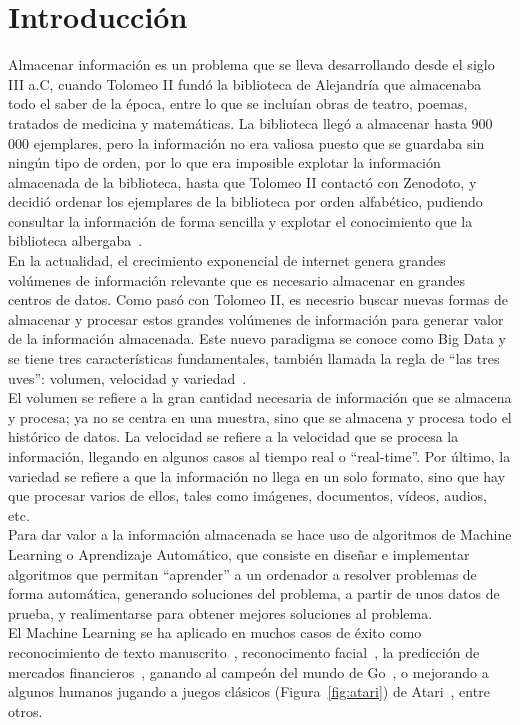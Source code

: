 \chapter{Introducción}

Almacenar información es un problema que se lleva desarrollando desde el siglo III a.C, cuando Tolomeo II fundó la biblioteca de Alejandría que almacenaba todo el saber de la época, entre lo que se incluían obras de teatro, poemas, tratados de medicina y matemáticas. La biblioteca llegó a almacenar hasta 900\,000 ejemplares, pero la información no era valiosa puesto que se guardaba sin ningún tipo de orden, por lo que era imposible explotar la información almacenada de la biblioteca, hasta que Tolomeo II contactó con Zenodoto, y decidió ordenar los ejemplares de la biblioteca por orden alfabético, pudiendo consultar la información de forma sencilla y explotar el conocimiento que la biblioteca albergaba~\cite{bigdataintroduccion}.\\

En la actualidad, el crecimiento exponencial de internet genera grandes volúmenes de información relevante que es necesario almacenar en grandes centros de datos. Como pasó con Tolomeo II, es necesrio buscar nuevas formas de almacenar y procesar estos grandes volúmenes de información para generar valor de la información almacenada. Este nuevo paradigma se conoce como Big Data y se tiene tres características fundamentales, también llamada la regla de ``las tres uves'': volumen, velocidad y variedad~\cite{bigdataoreilly}.\\
El volumen se refiere a la gran cantidad necesaria de información que se almacena y procesa; ya no se centra en una muestra, sino que se almacena y procesa todo el histórico de datos. La velocidad se refiere a la velocidad que se procesa la información, llegando en algunos casos al tiempo real o ``real-time''. Por último, la variedad se refiere a que la información no llega en un solo formato, sino que hay que procesar varios de ellos, tales como imágenes, documentos, vídeos, audios, etc.\\

Para dar valor a la información almacenada se hace uso de algoritmos de Machine Learning o Aprendizaje Automático, que consiste en diseñar e implementar algoritmos que permitan ``aprender'' a un ordenador a resolver problemas de forma automática, generando soluciones del problema, a partir de unos datos de prueba, y realimentarse para obtener mejores soluciones al problema.\\
El Machine Learning se ha aplicado en muchos casos de éxito como reconocimiento de texto manuscrito~\cite{Murphy:2012:MLP:2380985}, reconocimento facial~\cite{Szeliski:2010:CVA:1941882}, la predicción de mercados financieros~\cite{citeulike:13778368}, ganando al campeón del mundo de Go~\cite{44806}, o mejorando a algunos humanos jugando a juegos clásicos (Figura~\ref{fig:atari}) de Atari~\cite{mnih-dqn-2015}, entre otros.\\

